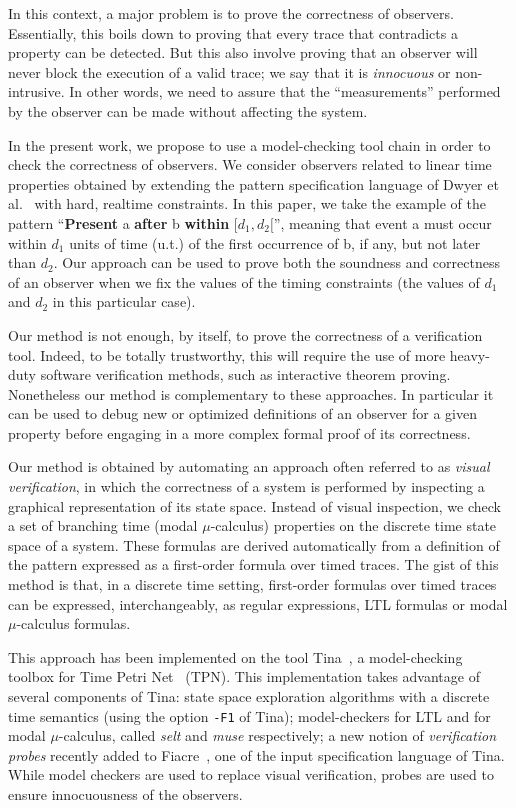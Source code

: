 \documentclass[a4paper]{scrartcl}
\def\code#1{\textsf{\small\bfseries #1}}
\def\vars#1{\textsf{\small #1}}
\begin{document}
In this context, a major problem is to prove the correctness of
observers. Essentially, this boils down to proving that every trace
that contradicts a property can be detected. But this also involve
proving that an observer will never block the execution of a valid
trace; we say that it is \emph{innocuous} or non-intrusive. In other
words, we need to assure that the ``measurements'' performed by the
observer can be made without affecting the system.

In the present work, we propose to use a model-checking tool chain in
order to check the correctness of observers. We consider observers
related to linear time properties obtained by extending the pattern
specification language of Dwyer et al.~\cite{ksu} with hard, realtime
constraints. In this paper, we take the example of the pattern
``\code{Present} \vars{a} \code{after} \vars{b} \code{within} $[d_1,
d_2[$'', meaning that event \vars{a} must occur within $d_1$ units of
time (u.t.) of the first occurrence of \vars{b}, if any, but not later
than $d_2$. Our approach can be used to prove both the soundness and
correctness of an observer when we fix the values of the timing
constraints (the values of $d_1$ and $d_2$ in this particular
case). 

Our method is not enough, by itself, to prove the correctness of a
verification tool. Indeed, to be totally trustworthy, this will
require the use of more heavy-duty software verification methods, such
as interactive theorem proving. Nonetheless our method is
complementary to these approaches. In particular it can be used to
debug new or optimized definitions of an observer for a given property
before engaging in a more complex formal proof of its correctness.

Our method is obtained by automating an approach often referred to as
\emph{visual verification}, in which the correctness of a system is
performed by inspecting a graphical representation of its state
space. Instead of visual inspection, we check a set of branching time
(modal $\mu$-calculus) properties on the discrete time state space of
a system. These formulas are derived automatically from a definition
of the pattern expressed as a first-order formula over timed
traces. The gist of this method is that, in a discrete time setting,
first-order formulas over timed traces can be expressed,
interchangeably, as regular expressions, LTL formulas or modal
$\mu$-calculus formulas.

This approach has been implemented on the tool Tina~\cite{tina}, a
model-checking toolbox for Time Petri Net~\cite{merlin} (TPN). This
implementation takes advantage of several components of Tina: state
space exploration algorithms with a discrete time semantics (using the
option \texttt{-F1} of Tina); model-checkers for LTL and for modal
$\mu$-calculus, called \emph{selt} and \emph{muse} respectively; a new
notion of \emph{verification probes} recently added to
Fiacre~\cite{Fiacre07,filfmvte2008}, one of the input specification
language of Tina. While model checkers are used to replace visual
verification, probes are used to ensure innocuousness of the
observers.
\end{document}
